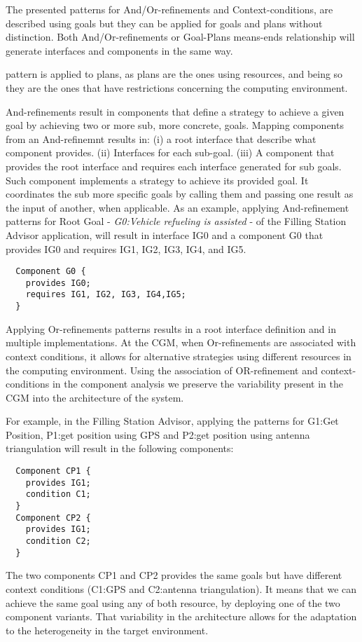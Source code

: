 The presented patterns for And/Or-refinements and Context-conditions, are described using goals but they can be applied for goals and plans without distinction. Both And/Or-refinements or Goal-Plans means-ends relationship will generate interfaces and components in the same way.

 pattern is applied to plans, as plans are the ones using resources, and being so they are the ones that have restrictions concerning the computing environment.

And-refinements result in components that define a strategy to achieve a given goal by achieving two or more sub, more concrete, goals.
Mapping components from an And-refinemnt results in: (i) a root interface that describe what component provides. (ii) Interfaces for each sub-goal. (iii) A component that provides the root interface and requires each interface generated for sub goals.
Such component implements a strategy to achieve its provided goal. It coordinates the sub more specific goals by calling them and passing one result as the input of another, when applicable.
As an example, applying And-refinement patterns for Root Goal - \emph{G0:Vehicle refueling is assisted} - of the Filling Station Advisor application, will result in interface IG0 and a component G0 that provides IG0 and requires IG1, IG2, IG3, IG4, and IG5.
\begin{lstlisting}
  Component G0 {
    provides IG0;
    requires IG1, IG2, IG3, IG4,IG5;
  }
\end{lstlisting}

Applying Or-refinements patterns results in a root interface definition and in multiple implementations. At the CGM, when Or-refinements are associated with context conditions, it allows for alternative strategies using different resources in the computing environment. Using the association of OR-refinement and context-conditions in the component analysis we preserve the variability present in the CGM into the architecture of the system.

For example, in the Filling Station Advisor, applying the patterns for G1:Get Position, P1:get position using GPS and P2:get position using antenna triangulation will result in the following components:

\begin{lstlisting}
  Component CP1 {
    provides IG1;
    condition C1;
  }
  Component CP2 {
    provides IG1;
    condition C2;
  }
\end{lstlisting}

The two components CP1 and CP2 provides the same goals but have different context conditions (C1:GPS and C2:antenna triangulation). It means that we can achieve the same goal using any of both resource, by deploying one of the two component variants.
That variability in the architecture allows for the adaptation to the heterogeneity in the target environment.

